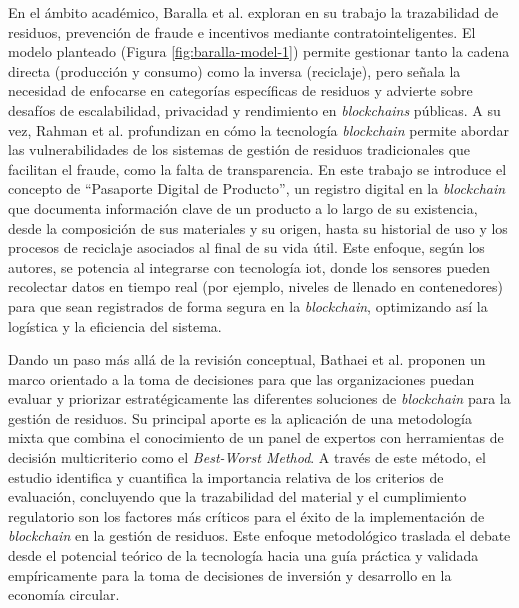 En el ámbito académico, Baralla et al. \cite{baralla2023waste} exploran en su trabajo la trazabilidad de residuos, prevención de fraude e incentivos mediante \glspl{contratointeligente}. El modelo planteado (Figura \ref{fig:baralla-model-1}) permite gestionar tanto la cadena directa (producción y consumo) como la inversa (reciclaje), pero señala la necesidad de enfocarse en categorías específicas de residuos y advierte sobre desafíos de escalabilidad, privacidad y rendimiento en \textit{blockchains} públicas. A su vez, Rahman et al. \cite{rahman2025traceable} profundizan en cómo la tecnología \textit{blockchain} permite abordar las vulnerabilidades de los sistemas de gestión de residuos tradicionales que facilitan el fraude, como la falta de transparencia. En este trabajo se introduce el concepto de ``Pasaporte Digital de Producto'', un registro digital en la \textit{blockchain} que documenta información clave de un producto a lo largo de su existencia, desde la composición de sus materiales y su origen, hasta su historial de uso y los procesos de reciclaje asociados al final de su vida útil. Este enfoque, según los autores, se potencia al integrarse con tecnología \gls{iot}, donde los sensores pueden recolectar datos en tiempo real (por ejemplo, niveles de llenado en contenedores) para que sean registrados de forma segura en la \textit{blockchain}, optimizando así la logística y la eficiencia del sistema.

Dando un paso más allá de la revisión conceptual, Bathaei et al. \cite{bathaei2025blockchain} proponen un marco orientado a la toma de decisiones para que las organizaciones puedan evaluar y priorizar estratégicamente las diferentes soluciones de \textit{blockchain} para la gestión de residuos. Su principal aporte es la aplicación de una metodología mixta que combina el conocimiento de un panel de expertos con herramientas de decisión multicriterio como el \textit{Best-Worst Method}. A través de este método, el estudio identifica y cuantifica la importancia relativa de los criterios de evaluación, concluyendo que la trazabilidad del material y el cumplimiento regulatorio son los factores más críticos para el éxito de la implementación de \textit{blockchain} en la gestión de residuos. Este enfoque metodológico traslada el debate desde el potencial teórico de la tecnología hacia una guía práctica y validada empíricamente para la toma de decisiones de inversión y desarrollo en la economía circular.

